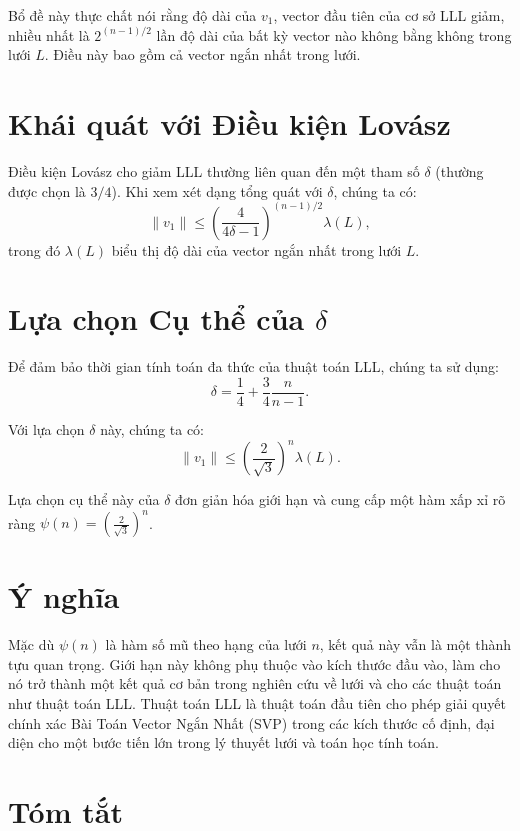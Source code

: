 \documentclass{article}
\begin{document}
Bổ đề này thực chất nói rằng độ dài của \( v_1 \), vector đầu tiên của cơ sở LLL giảm, nhiều nhất là \( 2^{(n-1)/2} \) lần độ dài của bất kỳ vector nào không bằng không trong lưới \( L \). Điều này bao gồm cả vector ngắn nhất trong lưới.

\section*{Khái quát với Điều kiện Lovász}

Điều kiện Lovász cho giảm LLL thường liên quan đến một tham số \( \delta \) (thường được chọn là \( 3/4 \)). Khi xem xét dạng tổng quát với \( \delta \), chúng ta có:
\[ \|v_1\| \leq \left( \frac{4}{4\delta - 1} \right)^{(n-1)/2} \lambda(L), \]
trong đó \( \lambda(L) \) biểu thị độ dài của vector ngắn nhất trong lưới \( L \).

\section*{Lựa chọn Cụ thể của \( \delta \)}

Để đảm bảo thời gian tính toán đa thức của thuật toán LLL, chúng ta sử dụng:
\[ \delta = \frac{1}{4} + \frac{3}{4}\frac{n}{n-1}. \]

Với lựa chọn \( \delta \) này, chúng ta có:
\[ \|v_1\| \leq \left( \frac{2}{\sqrt{3}} \right)^n \lambda(L). \]

Lựa chọn cụ thể này của \( \delta \) đơn giản hóa giới hạn và cung cấp một hàm xấp xỉ rõ ràng \( \psi(n) = \left( \frac{2}{\sqrt{3}} \right)^n \).

\section*{Ý nghĩa}

Mặc dù \( \psi(n) \) là hàm số mũ theo hạng của lưới \( n \), kết quả này vẫn là một thành tựu quan trọng. Giới hạn này không phụ thuộc vào kích thước đầu vào, làm cho nó trở thành một kết quả cơ bản trong nghiên cứu về lưới và cho các thuật toán như thuật toán LLL. Thuật toán LLL là thuật toán đầu tiên cho phép giải quyết chính xác Bài Toán Vector Ngắn Nhất (SVP) trong các kích thước cố định, đại diện cho một bước tiến lớn trong lý thuyết lưới và toán học tính toán.

\section*{Tóm tắt}
\end{document}
